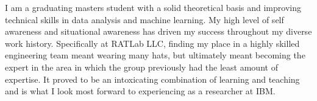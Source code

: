

\begin{cvparagraph}

I am a graduating masters student with a solid theoretical basis and improving technical skills in data analysis and machine learning. My high level of self awareness and situational awareness has driven my success throughout my diverse work history. Specifically at RATLab LLC, finding my place in a highly skilled engineering team meant wearing many hats, but ultimately meant becoming the expert in the area in which the group previously had the least amount of expertise. It proved to be an intoxicating combination of learning and teaching and is what I look most forward to experiencing as a researcher at IBM.
\end{cvparagraph}
